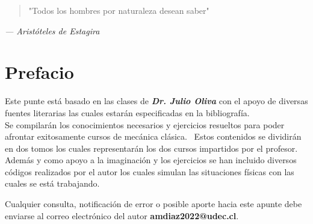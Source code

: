 \documentclass[../main.tex]{subfiles}
\begin{document}
\thispagestyle{empty}

\vspace*{\fill}  %
\begin{center}
    \begin{quote}
        "Todos los hombres por naturaleza desean saber"
    \end{quote}
    \vspace{1cm}  %
    \textit{— Aristóteles de Estagira}  %
\end{center}

\vspace*{\fill}  %
\newpage

\chapter*{Prefacio}

Este punte está basado en las clases de \textbf{\emph{Dr. Julio Oliva}} con el apoyo de diversas fuentes literarias las cuales estarán especificadas en la bibliografía. \\
Se compilarán los conocimientos necesarios y ejercicios resueltos para poder afrontar exitosamente cursos de mecánica clásica.  \
Estos contenidos se dividirán en dos tomos los cuales representarán los dos cursos impartidos por el profesor. \\
Además y como apoyo a la imaginación y los ejercicios se han incluido diversos códigos realizados por el autor los cuales simulan las situaciones físicas con las cuales se está trabajando.

\medskip

Cualquier consulta, notificación de error o posible aporte hacia este apunte debe enviarse al correo electrónico del autor \textbf{amdiaz2022@udec.cl}.
\end{document}
